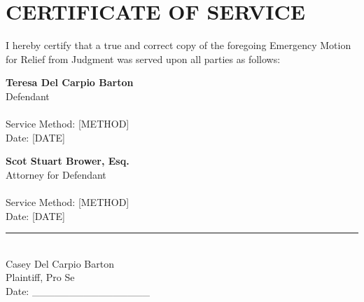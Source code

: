 \documentclass[12pt,letterpaper]{article}
\begin{document}
\vspace{0.3in}

\section{CERTIFICATE OF SERVICE}

I hereby certify that a true and correct copy of the foregoing Emergency Motion for Relief from Judgment was served upon all parties as follows:

\vspace{0.2in}

\textbf{Teresa Del Carpio Barton}\\
Defendant\\
[ADDRESS]\\
Service Method: [METHOD]\\
Date: [DATE]

\vspace{0.2in}

\textbf{Scot Stuart Brower, Esq.}\\
Attorney for Defendant\\
[ADDRESS]\\
Service Method: [METHOD]\\
Date: [DATE]

\vspace{0.5in}

\rule{3in}{0.4pt}\\
Casey Del Carpio Barton\\
Plaintiff, Pro Se\\
Date: \_\_\_\_\_\_\_\_\_\_\_\_\_\_\_\_
\end{document}

